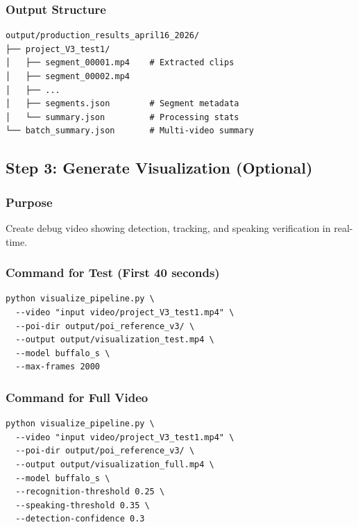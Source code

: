 \documentclass[11pt,a4paper]{article}
\begin{document}
\subsubsection{Output Structure}

\begin{verbatim}
output/production_results_april16_2026/
├── project_V3_test1/
│   ├── segment_00001.mp4    # Extracted clips
│   ├── segment_00002.mp4
│   ├── ...
│   ├── segments.json        # Segment metadata
│   └── summary.json         # Processing stats
└── batch_summary.json       # Multi-video summary
\end{verbatim}

\subsection{Step 3: Generate Visualization (Optional)}

\subsubsection{Purpose}

Create debug video showing detection, tracking, and speaking verification in real-time.

\subsubsection{Command for Test (First 40 seconds)}

\begin{lstlisting}[style=bashcode]
python visualize_pipeline.py \
  --video "input video/project_V3_test1.mp4" \
  --poi-dir output/poi_reference_v3/ \
  --output output/visualization_test.mp4 \
  --model buffalo_s \
  --max-frames 2000
\end{lstlisting}

\subsubsection{Command for Full Video}

\begin{lstlisting}[style=bashcode]
python visualize_pipeline.py \
  --video "input video/project_V3_test1.mp4" \
  --poi-dir output/poi_reference_v3/ \
  --output output/visualization_full.mp4 \
  --model buffalo_s \
  --recognition-threshold 0.25 \
  --speaking-threshold 0.35 \
  --detection-confidence 0.3
\end{lstlisting}
\end{document}
